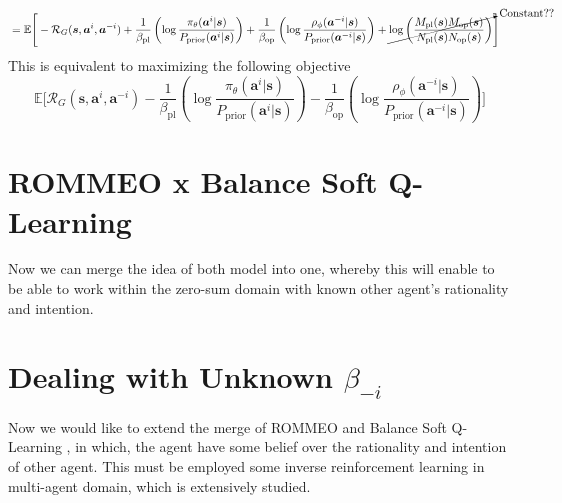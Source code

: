 \begin{equation}
\begin{aligned}
\begin{aligned}[t]
        \end{aligned} \\
        &=\begin{aligned}[t]
            \mathbb{E}\Bigg[ - \mathcal{R}_{G}(\boldsymbol{s}, \boldsymbol{a}^i, \boldsymbol{a}^{-i}) + \frac{1}{\beta_{\text{pl}}}\left(\log \frac{\pi_{\theta}(\boldsymbol{a}^i |\boldsymbol{s})}{P_{\text{prior}}(\boldsymbol{a}^i | \boldsymbol{s})}\right) + \frac{1}{\beta_{\text{op}}} \left(\log \frac{\rho_{\phi}(\boldsymbol{a}^{-i} |\boldsymbol{s})}{P_{\text{prior}}(\boldsymbol{a}^{-i} |\boldsymbol{s})}\right) + \cancelto{\text{Constant??}}{\log\left(\frac{M_{\text{pl}}(\boldsymbol{s})M_{\text{op}}(\boldsymbol{s})}{N_{\text{pl}}(\boldsymbol{s})N_{\text{op}}(\boldsymbol{s})}\right)} \Bigg]
        \end{aligned}
    \end{aligned}
\end{equation}
This is equivalent to maximizing the following objective 
\begin{equation}
    \mathbb{E}\Bigg[ \mathcal{R}_{G}(\boldsymbol{s}, \boldsymbol{a}^i, \boldsymbol{a}^{-i}) - \frac{1}{\beta_{\text{pl}}}\left(\log \frac{\pi_{\theta}(\boldsymbol{a}^i |\boldsymbol{s})}{P_{\text{prior}}(\boldsymbol{a}^i | \boldsymbol{s})}\right) - \frac{1}{\beta_{\text{op}}} \left(\log \frac{\rho_{\phi}(\boldsymbol{a}^{-i} |\boldsymbol{s})}{P_{\text{prior}}(\boldsymbol{a}^{-i} |\boldsymbol{s})}\right)  \Bigg]
\end{equation}


\section{ROMMEO \cite{tian2019regularized} x Balance Soft Q-Learning \cite{grau2018balancing}}

Now we can merge the idea of both model into one, whereby this will enable \cite{tian2019regularized} to be able to work within the zero-sum domain with known other agent's rationality and intention.

\section{Dealing with Unknown $\beta_{-i}$}
Now we would like to extend the merge of ROMMEO \cite{tian2019regularized} and Balance Soft Q-Learning \cite{grau2018balancing}, in which, the agent have some belief over the rationality and intention of other agent. This must be employed some inverse reinforcement learning in multi-agent domain, which is extensively studied.

